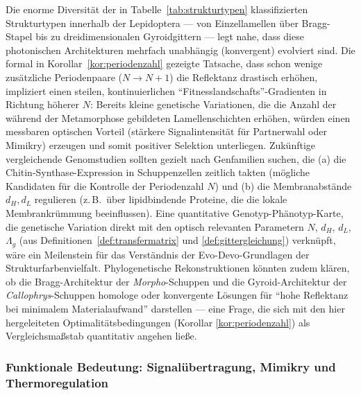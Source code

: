 ﻿\documentclass[a4paper,12pt]{article}
\theoremstyle{definition}
\begin{document}
	Die enorme Diversität der in Tabelle~\ref{tab:strukturtypen}
	klassifizierten Strukturtypen innerhalb der Lepidoptera --- von
	Einzellamellen über Bragg-Stapel bis zu dreidimensionalen
	Gyroidgittern --- legt nahe, dass diese photonischen Architekturen
	mehrfach unabhängig (konvergent) evolviert sind. Die formal in
	Korollar~\ref{kor:periodenzahl} gezeigte Tatsache, dass schon wenige
	zusätzliche Periodenpaare ($N\to N+1$) die Reflektanz drastisch
	erhöhen, impliziert einen steilen, kontinuierlichen
	``Fitnesslandschafts''-Gradienten in Richtung höherer $N$: Bereits
	kleine genetische Variationen, die die Anzahl der während der
	Metamorphose gebildeten Lamellenschichten erhöhen, würden einen
	messbaren optischen Vorteil (stärkere Signalintensität für
	Partnerwahl oder Mimikry) erzeugen und somit positiver Selektion
	unterliegen. Zukünftige vergleichende Genomstudien sollten gezielt
	nach Genfamilien suchen, die (a) die Chitin-Synthase-Expression in
	Schuppenzellen zeitlich takten (mögliche Kandidaten für die
	Kontrolle der Periodenzahl $N$) und (b) die Membranabstände
	$d_H,d_L$ regulieren (z.\,B.\ über lipidbindende Proteine, die die
	lokale Membrankrümmung beeinflussen). Eine quantitative
	Genotyp-Phänotyp-Karte, die genetische Variation direkt mit den
	optisch relevanten Parametern $N$, $d_H$, $d_L$, $\Lambda_g$
	(aus Definitionen~\ref{def:transfermatrix} und
	\ref{def:gittergleichung}) verknüpft, wäre ein Meilenstein für das
	Verständnis der Evo-Devo-Grundlagen der Strukturfarbenvielfalt.
	Phylogenetische Rekonstruktionen könnten zudem klären, ob die
	Bragg-Architektur der \textit{Morpho}-Schuppen und die
	Gyroid-Architektur der \textit{Callophrys}-Schuppen homologe oder
	konvergente Lösungen für ``hohe Reflektanz bei minimalem
	Materialaufwand'' darstellen --- eine Frage, die sich mit den hier
	hergeleiteten Optimalitätsbedingungen (Korollar
	\ref{kor:periodenzahl}) als Vergleichsmaßstab quantitativ angehen
	ließe.

	\subsubsection{Funktionale Bedeutung: Signalübertragung, Mimikry und Thermoregulation}
\end{document}
